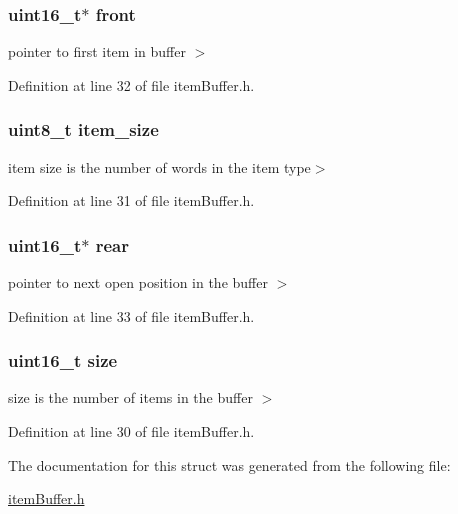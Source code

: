 \hypertarget{structitem__buffer__t_ab847ad149402d20140c60b31005c35c0}{}
\subsubsection[{front}]{\setlength{\rightskip}{0pt plus 5cm}uint16\+\_\+t$\ast$ front}\label{structitem__buffer__t_ab847ad149402d20140c60b31005c35c0}
pointer to first item in buffer $>$ 

Definition at line 32 of file item\+Buffer.\+h.

\hypertarget{structitem__buffer__t_af7ab82f3973a1053b872fba31f28a456}{}
\subsubsection[{item\+\_\+size}]{\setlength{\rightskip}{0pt plus 5cm}uint8\+\_\+t item\+\_\+size}\label{structitem__buffer__t_af7ab82f3973a1053b872fba31f28a456}
item size is the number of words in the item type$>$ 

Definition at line 31 of file item\+Buffer.\+h.

\hypertarget{structitem__buffer__t_aebff95be43c7ec20659e5619ce2b82c9}{}
\subsubsection[{rear}]{\setlength{\rightskip}{0pt plus 5cm}uint16\+\_\+t$\ast$ rear}\label{structitem__buffer__t_aebff95be43c7ec20659e5619ce2b82c9}
pointer to next open position in the buffer $>$ 

Definition at line 33 of file item\+Buffer.\+h.

\hypertarget{structitem__buffer__t_aaba88b24a21a6c70c895c0d55f4a69a0}{}
\subsubsection[{size}]{\setlength{\rightskip}{0pt plus 5cm}uint16\+\_\+t size}\label{structitem__buffer__t_aaba88b24a21a6c70c895c0d55f4a69a0}
size is the number of items in the buffer $>$ 

Definition at line 30 of file item\+Buffer.\+h.



The documentation for this struct was generated from the following file\+:\begin{DoxyCompactItemize}
\item 
\hyperlink{item_buffer_8h}{item\+Buffer.\+h}\end{DoxyCompactItemize}
